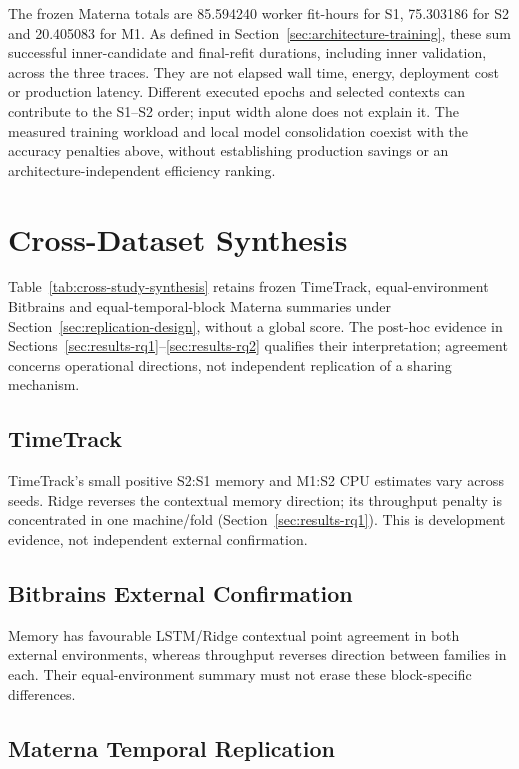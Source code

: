 \documentclass[a4paper,fleqn]{cas-dc}
\begin{document}
The frozen Materna totals are 85.594240 worker fit-hours for S1, 75.303186 for
S2 and 20.405083 for M1. As defined in Section~\ref{sec:architecture-training},
these sum successful inner-candidate and final-refit durations, including
inner validation, across the three traces. They are not elapsed wall time,
energy, deployment cost or production latency. Different executed epochs and
selected contexts can contribute to the S1--S2 order; input width alone does
not explain it. The measured training workload and local model consolidation
coexist with the accuracy penalties above, without establishing production
savings or an architecture-independent efficiency ranking.

\section{Cross-Dataset Synthesis}
\label{sec:cross-dataset-synthesis}

Table~\ref{tab:cross-study-synthesis} retains frozen TimeTrack,
equal-environment Bitbrains and equal-temporal-block Materna summaries under
Section~\ref{sec:replication-design}, without a global score.
The post-hoc evidence in Sections~\ref{sec:results-rq1}--\ref{sec:results-rq2}
qualifies their interpretation; agreement concerns operational directions,
not independent replication of a sharing mechanism.



\subsection{TimeTrack}

TimeTrack's small positive S2:S1 memory and M1:S2 CPU estimates vary across
seeds. Ridge reverses the contextual memory direction; its throughput penalty
is concentrated in one machine/fold (Section~\ref{sec:results-rq1}).
This is development evidence, not independent external confirmation.

\subsection{Bitbrains External Confirmation}

Memory has favourable LSTM/Ridge contextual point agreement in both external
environments, whereas throughput reverses direction between families in each.
Their equal-environment summary must not erase these block-specific differences.

\subsection{Materna Temporal Replication}
\end{document}
